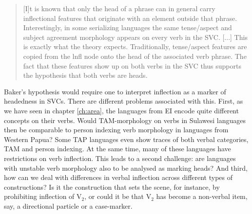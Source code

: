 \begin{quote}[I]t is known that only the head of a phrase can in general carry inflectional features that originate with an element outside that phrase. Interestingly, in some serializing languages the same tense/aspect and subject agreement morphology appears on every verb in the SVC. [...]  This is exactly what the theory expects. Traditionally, tense/aspect features are copied from the lnfl node onto the head of the associated verb phrase. The fact that these features show up on both verbs in the SVC thus supports the hypothesis that both verbs are heads.
 \end{quote}
 
Baker's hypothesis would require one to interpret inflection as a marker of headedness in SVCs. There are different problems associated with this. First, as we have seen in chapter \ref{ch:area}, the languages from EI encode quite different concepts on their verbs. Would TAM-morphology on verbs in Sulawesi languages then be comparable to person indexing verb morphology in languages from Western Papua? Some TAP languages even show traces of both verbal categories, TAM and person indexing. At the same time, many of these languages have restrictions on verb inflection. This leads to a second challenge: are languages with unstable verb morphology also to be analysed as marking heads? And third, how can we deal with differences in verbal inflection across different types of constructions? Is it the construction that sets the scene, for instance, by prohibiting inflection of V$_2$, or could it be that V$_2$ has become a non-verbal item, say, a directional particle or a case-marker.

